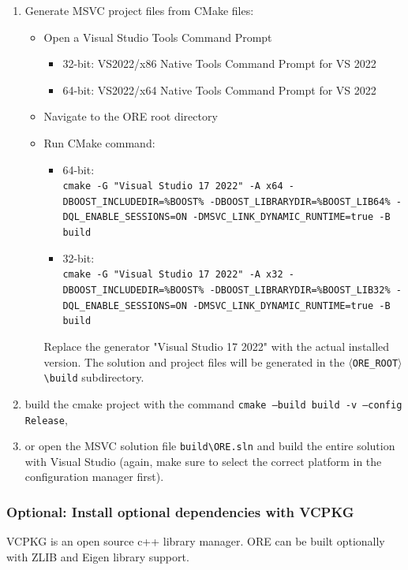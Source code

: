 \documentclass[12pt, a4paper]{article}
\newcommand{\bs}{\textbackslash}
\begin{document}
\begin{enumerate}

\item Generate MSVC project files from CMake files:
\begin{itemize}
\item Open a Visual Studio Tools Command Prompt
\begin{itemize}
\item 32-bit: VS2022/x86 Native Tools Command Prompt for VS 2022
\item 64-bit: VS2022/x64 Native Tools Command Prompt for VS 2022
\end{itemize}
\item Navigate to the ORE root directory
\item Run CMake command:
\begin{itemize}
\item 64-bit: \\
{\tt cmake -G "Visual Studio 17 2022" -A x64 -DBOOST\_INCLUDEDIR=\%BOOST\% -DBOOST\_LIBRARYDIR=\%BOOST\_LIB64\% -DQL\_ENABLE\_SESSIONS=ON -DMSVC\_LINK\_DYNAMIC\_RUNTIME=true -B build}
\item 32-bit: \\
{\tt cmake -G "Visual Studio 17 2022" -A x32 -DBOOST\_INCLUDEDIR=\%BOOST\% -DBOOST\_LIBRARYDIR=\%BOOST\_LIB32\% -DQL\_ENABLE\_SESSIONS=ON -DMSVC\_LINK\_DYNAMIC\_RUNTIME=true -B build}
\end{itemize}
Replace the generator "Visual Studio 17 2022" with the actual installed version.
The solution and project files will be generated in the {\tt $\langle$ORE\_ROOT$\rangle${\bs}build} subdirectory.
\end{itemize}

\item build the cmake project with the command {\tt cmake --build build -v --config Release}, 

\item or open the MSVC solution file {\tt build{\bs}ORE.sln} and build the entire solution with Visual Studio (again, make sure to select the correct platform in the configuration manager first).
\end{enumerate}

\subsubsection*{Optional: Install optional dependencies with VCPKG}

VCPKG is an open source c++ library manager. ORE can be built optionally with ZLIB and Eigen library support. 
\end{document}
